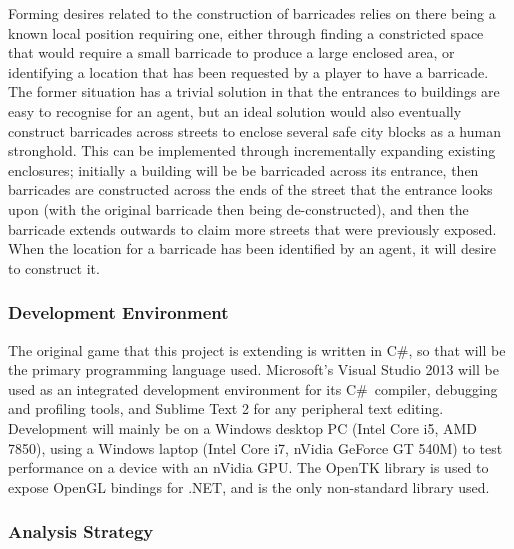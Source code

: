 \documentclass[12pt,a4paper]{article}
\newcommand{\Csh}{C{\lserif\#}}
\begin{document}
Forming desires related to the construction of barricades relies on there being a known local position requiring one, either through finding a constricted space that would require a small barricade to produce a large enclosed area, or identifying a location that has been requested by a player to have a barricade. The former situation has a trivial solution in that the entrances to buildings are easy to recognise for an agent, but an ideal solution would also eventually construct barricades across streets to enclose several safe city blocks as a human stronghold. This can be implemented through incrementally expanding existing enclosures; initially a building will be be barricaded across its entrance, then barricades are constructed across the ends of the street that the entrance looks upon (with the original barricade then being de-constructed), and then the barricade extends outwards to claim more streets that were previously exposed. When the location for a barricade has been identified by an agent, it will desire to construct it.


\subsubsection{Development Environment}\noindent
The original game that this project is extending is written in \Csh, so that will be the primary programming language used. Microsoft's Visual Studio 2013 will be used as an integrated development environment for its \Csh~compiler, debugging and profiling tools, and Sublime Text 2 for any peripheral text editing. Development will mainly be on a Windows desktop PC (Intel Core i5, AMD 7850), using a Windows laptop (Intel Core i7, nVidia GeForce GT 540M) to test performance on a device with an nVidia GPU. The OpenTK library is used to expose OpenGL bindings for .NET, and is the only non-standard library used.

\subsubsection{Analysis Strategy}

%
\end{document}
